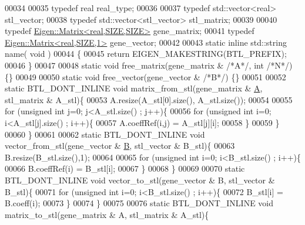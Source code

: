 \begin{DoxyCode}
00034 
00035   \textcolor{keyword}{typedef} real real\_type;
00036 
00037   \textcolor{keyword}{typedef} std::vector<real> stl\_vector;
00038   \textcolor{keyword}{typedef} std::vector<stl\_vector> stl\_matrix;
00039 
00040   \textcolor{keyword}{typedef} \hyperlink{group___core___module_class_eigen_1_1_matrix}{Eigen::Matrix<real,SIZE,SIZE>} gene\_matrix;
00041   \textcolor{keyword}{typedef} \hyperlink{group___core___module_class_eigen_1_1_matrix}{Eigen::Matrix<real,SIZE,1>} gene\_vector;
00042 
00043   \textcolor{keyword}{static} \textcolor{keyword}{inline} std::string name( \textcolor{keywordtype}{void} )
00044   \{
00045     \textcolor{keywordflow}{return} EIGEN\_MAKESTRING(BTL\_PREFIX);
00046   \}
00047 
00048   \textcolor{keyword}{static} \textcolor{keywordtype}{void} free\_matrix(gene\_matrix & \textcolor{comment}{/*A*/}, \textcolor{keywordtype}{int} \textcolor{comment}{/*N*/}) \{\}
00049 
00050   \textcolor{keyword}{static} \textcolor{keywordtype}{void} free\_vector(gene\_vector & \textcolor{comment}{/*B*/}) \{\}
00051 
00052   \textcolor{keyword}{static} BTL\_DONT\_INLINE \textcolor{keywordtype}{void} matrix\_from\_stl(gene\_matrix & \hyperlink{group___core___module_class_eigen_1_1_matrix}{A}, stl\_matrix & A\_stl)\{
00053     A.resize(A\_stl[0].size(), A\_stl.size());
00054 
00055     \textcolor{keywordflow}{for} (\textcolor{keywordtype}{unsigned} \textcolor{keywordtype}{int} j=0; j<A\_stl.size() ; j++)\{
00056       \textcolor{keywordflow}{for} (\textcolor{keywordtype}{unsigned} \textcolor{keywordtype}{int} i=0; i<A\_stl[j].size() ; i++)\{
00057         A.coeffRef(i,j) = A\_stl[j][i];
00058       \}
00059     \}
00060   \}
00061 
00062   \textcolor{keyword}{static} BTL\_DONT\_INLINE  \textcolor{keywordtype}{void} vector\_from\_stl(gene\_vector & \hyperlink{group___core___module_class_eigen_1_1_matrix}{B}, stl\_vector & B\_stl)\{
00063     B.resize(B\_stl.size(),1);
00064 
00065     \textcolor{keywordflow}{for} (\textcolor{keywordtype}{unsigned} \textcolor{keywordtype}{int} i=0; i<B\_stl.size() ; i++)\{
00066       B.coeffRef(i) = B\_stl[i];
00067     \}
00068   \}
00069 
00070   \textcolor{keyword}{static} BTL\_DONT\_INLINE  \textcolor{keywordtype}{void} vector\_to\_stl(gene\_vector & B, stl\_vector & B\_stl)\{
00071     \textcolor{keywordflow}{for} (\textcolor{keywordtype}{unsigned} \textcolor{keywordtype}{int} i=0; i<B\_stl.size() ; i++)\{
00072       B\_stl[i] = B.coeff(i);
00073     \}
00074   \}
00075 
00076   \textcolor{keyword}{static} BTL\_DONT\_INLINE  \textcolor{keywordtype}{void} matrix\_to\_stl(gene\_matrix & A, stl\_matrix & A\_stl)\{

\end{DoxyCode}
